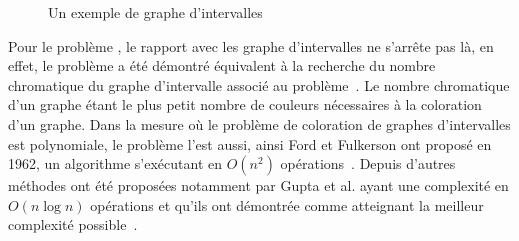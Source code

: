 \documentclass[a4paper,11pt]{article}
\begin{document}
\begin{figure}
    \centering
    \caption{Un exemple de graphe d'intervalles}
    \label{fig:ex_gint}
\end{figure}

Pour le problème \bisched, le rapport avec les graphe d'intervalles ne s'arrête pas là, en effet, le
problème a été démontré équivalent à la recherche du nombre chromatique du graphe d'intervalle
associé au problème~\cite{golumbicalgorithmic}. Le nombre chromatique d'un graphe étant le plus
petit nombre de couleurs nécessaires à la coloration d'un graphe. Dans la mesure où le problème de
coloration de graphes d'intervalles est polynomiale, le problème \bisched l'est aussi, ainsi Ford et
Fulkerson ont proposé en 1962, un algorithme s'exécutant en $O(n^2)$
opérations~\cite{ford1962network}. Depuis d'autres méthodes ont été proposées notamment par Gupta et
al. ayant une complexité en $O(n\log n)$ opérations et qu'ils ont démontrée comme atteignant la
meilleur complexité possible~\cite{gupta_optimal_1978}.
\end{document}
